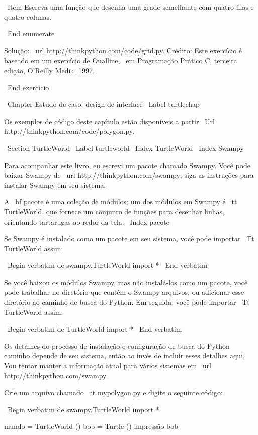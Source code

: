 \documentclass[10pt]{book}
\begin{document}
{\ Item Escreva uma função que desenha uma grade semelhante
com quatro filas e quatro colunas.

\ End {enumerate}

Solução: \ url {http://thinkpython.com/code/grid.py}.
Crédito: Este exercício é baseado em um exercício de Oualline, {\ em
    Programação Prático C, terceira edição}, O'Reilly Media, 1997.

\ End {} exercício





\ Chapter {Estudo de caso: design de interface}
\ Label {} turtlechap

Os exemplos de código deste capítulo estão disponíveis a partir
\ Url {http://thinkpython.com/code/polygon.py}.


\ Section {} TurtleWorld
\ Label {} turtleworld
\ Index {} TurtleWorld
\ Index {} Swampy

Para acompanhar este livro, eu escrevi um pacote chamado Swampy.
Você pode baixar Swampy de \ url {http://thinkpython.com/swampy};
siga as instruções para instalar Swampy em seu sistema.

A {\ bf pacote} é uma coleção de módulos; um dos módulos em
Swampy é {\ tt TurtleWorld}, que fornece um conjunto de funções para
desenhar linhas, orientando tartarugas ao redor da tela.
\ Index {pacote}

Se Swampy é instalado como um pacote em seu sistema, você pode importar
{\ Tt TurtleWorld} assim:

\ Begin {verbatim}
de swampy.TurtleWorld import *
\ End {verbatim}

Se você baixou os módulos Swampy, mas não instalá-los como um
pacote, você pode trabalhar no diretório que contém o Swampy
arquivos, ou adicionar esse diretório ao caminho de busca do Python. Em seguida, você pode importar
{\ Tt TurtleWorld} assim:

\ Begin {verbatim}
de TurtleWorld import *
\ End {verbatim}

Os detalhes do processo de instalação e configuração de busca do Python
caminho depende de seu sistema, então ao invés de incluir esses detalhes aqui,
Vou tentar manter a informação atual para vários sistemas
em \ url {http://thinkpython.com/swampy}

Crie um arquivo chamado {\ tt mypolygon.py} e digite o seguinte
código:

\ Begin {verbatim}
de swampy.TurtleWorld import *

mundo = TurtleWorld ()
bob = Turtle ()
impressão bob

}
\end{document}

